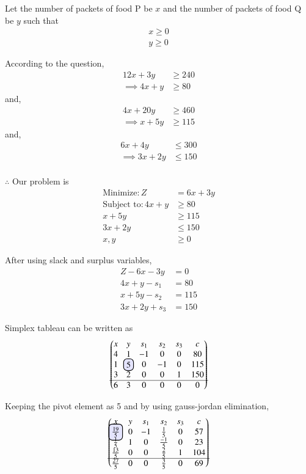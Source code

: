 \documentclass[journal,12pt,twocolumn]{IEEEtran}
\begin{document}
Let the number of packets of food P be $x$ and the number of packets of food Q be $y$  such that 
\begin{align}
    x \geq 0 \\
    y \geq 0 
\end{align}

According to the question,
\begin{align}
    12x+3y &\geq 240 \\
    \implies 4x+y &\geq 80
\end{align}
and,
\begin{align}
    4x+20y &\geq 460 \\
    \implies x+5y &\geq 115 
\end{align}
and,
\begin{align}
     6x+4y &\leq 300 \\
    \implies 3x+2y &\leq 150 \\
\end{align}

$\therefore$ Our problem is
\begin{align}
    \text{Minimize}:Z &= 6x+3y\\
    \text{Subject to}:
    4x+y &\geq 80 \\
    x+5y &\geq 115 \\
    3x+2y &\leq 150 \\
    x,y &\geq 0
\end{align}

After using slack and surplus variables,
\begin{align}
    Z-6x-3y &= 0\\
    4x+y-s_1 &= 80\\
    x+5y-s_2 &= 115\\
    3x+2y+s_3 &= 150
\end{align}

Simplex tableau can be written as
\begin{align}
\myvec{
 x & y & s_1 & s_2 & s_3 & c  \\ 
  4 & 1 & -1 & 0 & 0 & 80 \\ 
  1 & \hlight{5} & 0 & -1 & 0 & 115  \\ 
  3 & 2 & 0 & 0 & 1 & 150 \\ \hline
  6 & 3 & 0 & 0 & 0 & 0
}
\end{align}

Keeping the pivot element as 5 and by using gauss-jordan elimination, 
\begin{align}
\myvec{
 x & y & s_1 & s_2 & s_3 & c  \\ 
  \hlight{\frac{19}{5}} & 0 & -1 & \frac{1}{5} & 0 & 57 \\ 
  \frac{1}{5} & 1 & 0 & \frac{-1}{5} & 0 & 23  \\ 
  \frac{13}{5} & 0 & 0 & \frac{2}{5} & 1 & 104 \\ \hline
  \frac{27}{5} & 0 & 0 & \frac{3}{5} & 0 & 69
}
\end{align}
\end{document}
